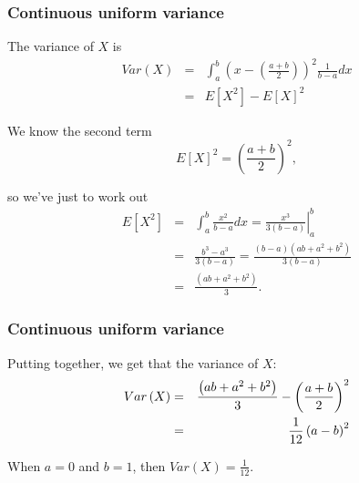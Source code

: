 \documentclass[notes=show,smaller,handout]{beamer}
\begin{document}
\begin{frame}%

\frametitle{Continuous uniform variance}

The variance of $X$ is%
\begin{eqnarray*}
Var\left( X\right) &=&\int_{a}^{b}\left( x-\left( \frac{a+b}{2}\right)
\right) ^{2}\frac{1}{b-a}dx \\
&=&E\left[ X^{2}\right] -E\left[ X\right] ^{2}
\end{eqnarray*}

We know the second term
\begin{equation*}
E\left[ X\right] ^{2}=\left( \frac{a+b}{2}\right) ^{2},
\end{equation*}

so we've just to work out%
\begin{eqnarray*}
E\left[ X^{2}\right] &=&\int_{a}^{b}\frac{x^{2}}{b-a}dx =\left. \frac{x^{3}}{3\left( b-a\right) }\right\vert _{a}^{b} \\
&=&\frac{b^{3}-a^{3}}{3\left( b-a\right) } = \frac{(b-a)\left( ab+a^{2}+b^{2}\right)}{3\left( b-a\right) } \\
&=&\frac{\left( ab+a^{2}+b^{2}\right) }{3}.
\end{eqnarray*}


\end{frame}%

\begin{frame}%

\frametitle{Continuous uniform variance}

Putting together, we get that the variance of $X$:%
\begin{eqnarray*}
Var\left( X\right) &=&\frac{\left( ab+a^{2}+b^{2}\right) }{3}-\left( \frac{%
a+b}{2}\right) ^{2} \\
&=&\frac{1}{12}\left( a-b\right) ^{2}
\end{eqnarray*}

\begin{example} [cont'd] 
When $a=0$ and $b=1$, then $Var\left( X\right) =\frac{1}{12}$.
\end{example} 
\end{frame}%
\end{document}
